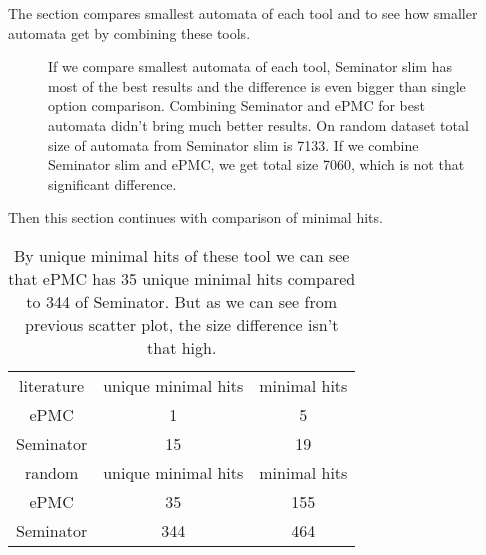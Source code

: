 \documentclass[
	digital
nolof, nolot
]{fithesis3}
\begin{document}
	
		The section compares smallest automata of each tool and to see how smaller automata get by combining these tools.
	
\begin{figure}[ht]
	\centering
	\caption{If we compare smallest automata of each tool, Seminator slim has most of the best results and the difference is even bigger than single option comparison. Combining Seminator and ePMC for best automata didn't bring much better results. On random dataset total size of automata from Seminator slim is 7133. If we combine Seminator slim and ePMC, we get total size 7060, which is not that significant difference.}
	\begin{tikzpicture}
		
	\end{tikzpicture}
\end{figure}
Then this section continues with comparison of minimal hits.

\begin{table}[ht]
	\centering
	\caption{By unique minimal hits of these tool we can see that ePMC has 35 unique minimal hits compared to 344 of Seminator. But as we can see from previous scatter plot, the size difference isn't that high.}
	\begin{tabular}{ |c||c|c| } 
		\hline
		literature&unique minimal hits&minimal hits\\
		\hhline{|===|}
		ePMC&1 & 5\\
		\hline
		Seminator &15 & 19\\ 
		\hline
		\hline
		random&unique minimal hits&minimal hits\\
		\hhline{|===|}
		ePMC&35 & 155\\
		\hline
		Seminator &344 & 464\\ 
		\hline
	\end{tabular}
\end{table}
		
	
	
	
		
		
\end{document}
